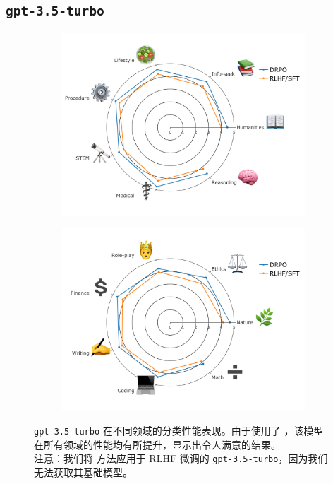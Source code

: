 \newpage
\subsection{\texttt{gpt-3.5-turbo}}

\begin{figure}[h]
\centering
\begin{subfigure}[b]{.5\textwidth}
  \centering
  \includegraphics[width=0.95\linewidth]{images/gpt_1.png}
  \label{fig:cat_gpt_1}
\end{subfigure}

\vspace{1em}

\begin{subfigure}[b]{.5\textwidth}
  \centering
  \includegraphics[width=0.95\linewidth]{images/gpt_2.png}
  \label{fig:cat_gpt_2}
\end{subfigure}
\caption{\texttt{gpt-3.5-turbo} 在不同领域的分类性能表现。由于使用了 \ours，该模型在所有领域的性能均有所提升，显示出令人满意的结果。\\
注意：我们将 \ours 方法应用于 RLHF 微调的 \texttt{gpt-3.5-turbo}，因为我们无法获取其基础模型。
}
\label{fig:categorized_performance_gpt}
\end{figure}

